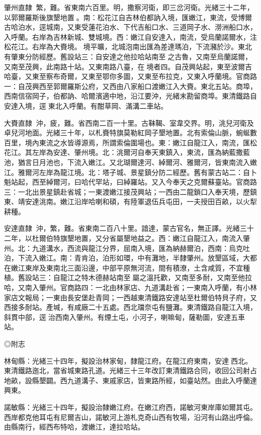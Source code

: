 \begin{pinyinscope}
肇州直隸：繁，難。省東南六百里。明，撒察河衛，即三岔河衛。光緒三十二年，以郭爾羅斯後旗墾地置。南：松花江自吉林伯都訥入境，匯嫩江，東流，受博爾古哈泊水，逕城南，又東受蓮花泊水、下代吉船口水、三道岡子水、澇洲船口水，入呼蘭。右岸為吉林新城、雙城境。西：嫩江自安達入，南流，受烏蘭諾爾水，注松花江。右岸為大賚境。境平曠，北城泡南出匯為差達瑪泊，下流瀦於沙。東北有肇東分防經歷。舊設站三：自安達之他拉哈站南至之古魯，又南至烏蘭諾爾，又南至茂興，此南路十站。又東南路八臺，在境者四。自茂興站起，東至波爾吉哈臺，又東至察布奇爾，又東至鄂你多圖，又東至布拉克，又東入呼蘭境。官商路一：自茂興西至郭爾羅斯公府，又西由八家船口渡嫩江入大賚。東北五站。商埠，西南信宿岡子，伯都訥、哈爾濱適中地，沿江要沖，光緒末勘留商埠。東清鐵路自安達入境，逕東北入呼蘭。有酣草岡、滿溝二車站。

大賚直隸：沖，疲，難。省西南二百一十里。古靺鞨、室韋交界。明，洮兒河衛及卓兒河地面。光緒三十年，以札賚特旗莫勒紅岡子墾地置。北有索倫山脈，蜿蜒數百里，境內東流之水皆導源焉，所謂索倫圍場也。東：嫩江自龍江入，南流，匯松花江。其左岸為安達、肇州境。北：洮爾河自奉天東鎮入，東流，匯為納藍撒藍池，猶言日月池也，下流入嫩江。又北瑚爾達河、綽爾河、雅爾河，皆東南流入嫩江。雅爾河左岸為龍江境。北：塔子城、景星鎮分防二經歷。舊有蒙古站二：自卜魁站起，西至綽爾河，曰哈代罕站，曰綽羅站。又入今奉天之克爾蘇臺站。官商路三：一北出景星鎮赴省城；一東渡嫩江接茂興站；一西由二龍鎖口入奉天境，歷鎮東、靖安達洮南。嫩江沿岸哈喇和碩，有陸軍退伍兵屯田，一夫授田百畝，以火犁耕種。

安達直隸：沖，繁，難。省東南二百八十里。諳達，蒙古官名，無正譯。光緒三十二年，以杜爾伯特旗墾地置，又分省屬墾地益之。西：嫩江自龍江入，南流入肇州。北：九道溝水，西流與龍江分界，屈南入境，匯為納赫爾泊，西南：烏克吐泊，下流入嫩江。南：青肯泊，泊形如環，中有灘地，半隸肇州。放墾區域，大都在嫩江東岸及東南北三面沿邊，中部平原無河流，間有積潦，土含咸質，不宜種植。舊設站三：自龍江之特木德赫站南至屬之溫托歡，又南至多耐，又南至他拉哈，又南入肇州。官商路四：一北由林家店、九道溝赴省；一東南入呼蘭，有小林家店文報局；一東由長安堡赴青岡；一西越東清鐵路安達站至杜爾伯特貝子府，又西接多耐站。產堿，有咸廠二十五處。西北璫奈屯有鹽灘。東清鐵路自龍江入境，斜貫中部，逕治西南入肇州。有煙土屯，小河子，喇嘛甸，薩勒圖，安達五車站。

◎附志

林甸縣：光緒三十四年，擬設治林家甸，隸龍江府。在龍江府東南，安達西北。東清鐵路迤北，當省城東路孔道。光緒三十三年改訂東清鐵路合同，收回公司射占地畝，設縣墾闢。西九道溝子、東戚家店，皆東路所經，如臺站然。由此入呼蘭達興東。

諾敏縣：光緒三十四年，擬設治隸嫩江府。在嫩江府西，諾敏河東岸庫如爾其屯。西岸都克他耳屯有尼爾吉山，諾敏河上游札克奇山西有牧場，沿河有山路出呼倫。由縣南行，經西布特哈，渡嫩江，達拉哈站。


\end{pinyinscope}
